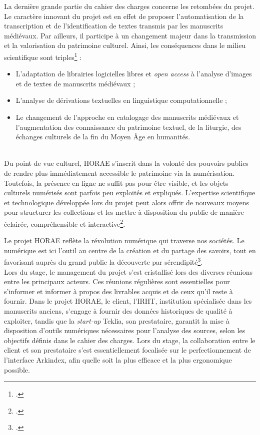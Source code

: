\documentclass[a4paper,12pt,twoside]{book}
\begin{document}
	    La dernière grande partie du cahier des charges concerne les retombées du projet. Le caractère innovant du projet est en effet de proposer l'automatisation de la transcription et de l'identification de textes transmis par les manuscrits médiévaux. Par ailleurs, il participe à un changement majeur dans la transmission et la valorisation du patrimoine culturel. Ainsi, les conséquences dans le milieu scientifique sont triples\footcite[p. 17-18]{HORAE_projet} : 
	    \begin{itemize}
	        \item L'adaptation de librairies logicielles libres et \textit{open access} à l'analyse d'images et de textes de manuscrits médiévaux ;
	        \item L'analyse de dérivations textuelles en linguistique computationnelle ;
	        \item Le changement de l'approche en catalogage des manuscrits médiévaux et l'augmentation des connaissance du patrimoine textuel, de la liturgie, des échanges culturels de la fin du Moyen Âge en humanités. 
	    \end{itemize}\\
	    
	    Du point de vue culturel, HORAE s'inscrit dans la volonté des pouvoirs publics de rendre plus immédiatement accessible le patrimoine via la numérisation. Toutefois, la présence en ligne ne suffit pas pour être visible, et les objets culturels numérisés sont parfois peu exploités et expliqués. L'expertise scientifique et technologique développée lors du projet peut alors offrir de nouveaux moyens pour structurer les collections et les mettre à disposition du public de manière éclairée, compréhensible et interactive\footcite[p. 18]{HORAE_projet}.  
	    
	    Le projet HORAE reflète la \og révolution numérique\fg{} qui traverse nos sociétés. Le numérique est ici l'outil au centre de la création et du partage des savoirs, tout en favorisant auprès du grand public la découverte par sérendipité\footcite[p. 18-19]{HORAE_projet}. \\
	    
	    Lors du stage, le management du projet s'est cristallisé lors des diverses réunions entre les principaux acteurs. Ces réunions régulières sont essentielles pour s'informer et informer à propos des livrables acquis et de ceux qu'il reste à fournir. Dans le projet HORAE, le client, l'IRHT, institution spécialisée dans les manuscrits anciens, s'engage à fournir des données historiques de qualité à exploiter, tandis que la \textit{start-up} Teklia, son prestataire, garantit la mise à disposition d'outils numériques nécessaires pour l'analyse des sources, selon les objectifs définis dans le cahier des charges. Lors du stage, la collaboration entre le client et son prestataire s'est essentiellement focalisée sur le perfectionnement de l'interface Arkindex, afin quelle soit la plus efficace et la plus ergonomique possible. 
\end{document}
